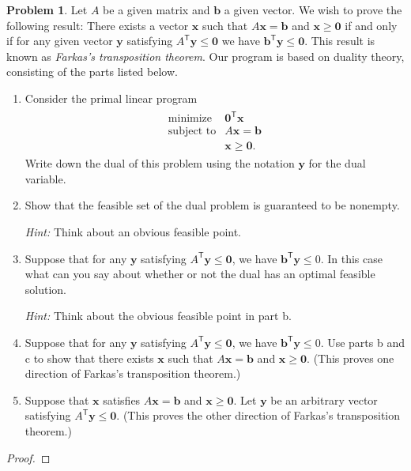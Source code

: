 \documentclass[12pt]{article}
\theoremstyle{definition}
\newtheorem{problem}{Problem}
\newcommand{\vc}[1]{\boldsymbol{#1}}
\newcommand{\tran}{\mathsf{T}}
\begin{document}
\begin{problem}
  Let $A$ be a given matrix and $\vc{b}$ a given vector. We wish to prove the
  following result: There exists a vector $\vc{x}$ such that $A\vc{x} = \vc{b}$ and
  $\vc{x} \geq \vc{0}$ if and only if for any given vector $\vc{y}$ satisfying $A^\tran \vc{y} \leq \vc{0}$
  we have $\vc{b}^\tran \vc{y} \leq \vc{0}$. This result is known as \textit{Farkas's transposition theorem}.
  Our program is based on duality theory, consisting of the parts listed below.
  \begin{enumerate}
    \item Consider the primal linear program
      \begin{align*}
        \begin{array}{rl}
          \text{minimize} & \vc{0}^\tran \vc{x} \\
          \text{subject to} & A\vc{x} = \vc{b} \\
          & \vc{x} \geq \vc{0}.
        \end{array}
      \end{align*}
      Write down the dual of this problem using the notation $\vc{y}$ for the dual variable.
    \item Show that the feasible set of the dual problem is guaranteed to be nonempty.

      \textit{Hint:} Think about an obvious feasible point.
    \item Suppose that for any $\vc{y}$ satisfying $A^\tran \vc{y} \leq \vc{0}$,
      we have $\vc{b}^\tran \vc{y} \leq 0$. In this case what can you say about whether
      or not the dual has an optimal feasible solution.

      \textit{Hint:} Think about the obvious feasible point in part b.
    \item Suppose that for any $\vc{y}$ satisfying $A^\tran \vc{y} \leq \vc{0}$,
      we have $\vc{b}^\tran \vc{y} \leq 0$. Use parts b and c to show that there exists
      $\vc{x}$ such that $A\vc{x} = \vc{b}$ and $\vc{x} \geq \vc{0}$. (This proves one
      direction of Farkas's transposition theorem.)
    \item Suppose that $\vc{x}$ satisfies $A\vc{x} = \vc{b}$ and $\vc{x} \geq \vc{0}$.
      Let $\vc{y}$ be an arbitrary vector satisfying $A^\tran \vc{y} \leq \vc{0}$.
      (This proves the other direction of Farkas's transposition theorem.)
  \end{enumerate}
\end{problem}

\begin{proof}
\end{proof}
\newpage
\end{document}
